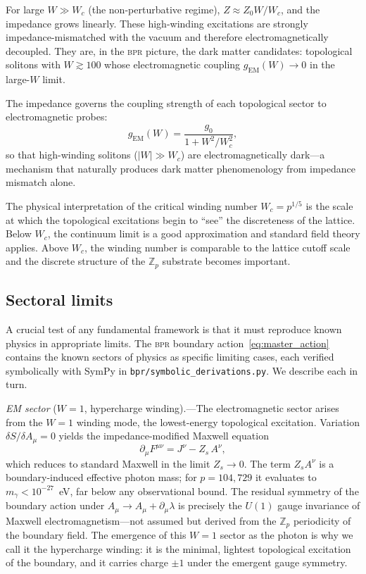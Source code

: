 \documentclass[aps,prd,twocolumn,superscriptaddress,longbibliography,nofootinbib]{revtex4-2}
\newcommand{\Zp}{\mathbb{Z}_p}
\newcommand{\Wc}{W_{\!c}}
\newcommand{\Zimp}{Z}
\newcommand{\Zvac}{Z_0}
\newcommand{\bpr}{\textsc{bpr}}
\begin{document}
For large $W \gg \Wc$ (the non-perturbative regime),
$\Zimp \approx \Zvac W/\Wc$, and the impedance grows linearly.
These high-winding excitations are strongly impedance-mismatched with
the vacuum and therefore electromagnetically decoupled.  They are, in
the \bpr{} picture, the dark matter candidates: topological solitons
with $W \gtrsim 100$ whose electromagnetic coupling
$g_{\mathrm{EM}}(W) \to 0$ in the large-$W$ limit.

The impedance governs the coupling strength of each topological
sector to electromagnetic probes:
\begin{equation}
g_{\mathrm{EM}}(W) = \frac{g_0}{1 + W^2/\Wc^2},
\label{eq:em_coupling}
\end{equation}
so that high-winding solitons ($|W| \gg \Wc$) are
electromagnetically dark---a mechanism that naturally produces dark
matter phenomenology from impedance mismatch alone.

The physical interpretation of the critical winding number
$\Wc = p^{1/5}$ is the scale at which the topological excitations
begin to ``see'' the discreteness of the lattice.  Below $\Wc$,
the continuum limit is a good approximation and standard field
theory applies.  Above $\Wc$, the winding number is comparable to
the lattice cutoff scale and the discrete structure of the $\Zp$
substrate becomes important.

\subsection{Sectoral limits}

A crucial test of any fundamental framework is that it must reproduce
known physics in appropriate limits.  The \bpr{} boundary
action~\eqref{eq:master_action} contains the known sectors of
physics as specific limiting cases, each verified symbolically with
SymPy in \texttt{bpr/symbolic\_derivations.py}.  We describe each
in turn.

\textit{EM sector} ($W = 1$, hypercharge winding).---The
electromagnetic sector arises from the $W = 1$ winding mode, the
lowest-energy topological excitation.  Variation
$\delta S / \delta A_\mu = 0$ yields the impedance-modified Maxwell
equation
\begin{equation}
\partial_\mu F^{\mu\nu} = J^\nu - Z_s\, A^\nu,
\label{eq:maxwell}
\end{equation}
which reduces to standard Maxwell in the limit $Z_s \to 0$.
The term $Z_s A^\nu$ is a boundary-induced effective photon mass; for
$p = 104{,}729$ it evaluates to $m_\gamma < 10^{-27}$~eV, far below
any observational bound.  The residual symmetry of the boundary
action under $A_\mu \to A_\mu + \partial_\mu \lambda$ is precisely
the $U(1)$ gauge invariance of Maxwell electromagnetism---not assumed
but derived from the $\Zp$ periodicity of the boundary field.
The emergence of this $W = 1$ sector as the photon is why we
call it the hypercharge winding: it is the minimal, lightest
topological excitation of the boundary, and it carries charge $\pm 1$
under the emergent gauge symmetry.
\end{document}
